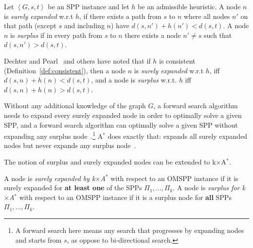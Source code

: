 \documentclass[smallextended]{svjour3}       %
\newcommand{\omspp}{\ac{OMSPP}\xspace}
\newcommand{\spp}{\ac{SPP}\xspace}
\newcommand{\astar}{A$^*$\xspace}
\newcommand{\kxastar}{k$\times$A$^*$\xspace}
\newcommand{\tuple}[1]{\ensuremath{\left \langle #1 \right \rangle }}
\begin{document}
\begin{definition}
  \label{def:surplus}
  Let $\tuple{G, s, t}$ be an \spp instance and let $h$ be an admissible heuristic.
  A node $n$ is \emph{surely expanded} w.r.t $h$, if there exists a path from $s$ to $n$ where all nodes $n'$ on that path (except $s$ and including $n$) have $d(s,n')+h(n')<d(s,t)$. 
  A node $n$ is \emph{surplus} if in every path from $s$ to $n$ there exists a node $n'\neq s$ such that $d(s,n')>d(s,t)$. 
\end{definition}
Dechter and Pearl~\cite{dechter1985generalizedBestFirst} and others have noted that if $h$ is consistent (Definition~\ref{def:consistent}), then a node $n$ is \emph{surely expanded} w.r.t $h$, iff $d(s,n)+h(n)<d(s,t)$, and a node is \emph{surplus} w.r.t. $h$ iff $d(s,n)+h(n)>d(s,t)$. 
    
    
Without any additional knowledge of the graph $G$, a forward search algorithm needs to expand every surely expanded node in order to optimally solve a given \spp, and a forward search algorithm can optimally solve a given \spp without expanding any surplus node~\cite{dechter1985generalizedBestFirst,goldenberg2014enhanced}.\footnote{A forward search here means any search that progresses by expanding nodes and starts from $s$, as oppose to bi-directional search.} 
\astar does exactly that: expands all surely expanded nodes but never expands any surplus node~\cite{dechter1985generalizedBestFirst}.

The notion of surplus and surely expanded nodes can be extended to \kxastar.
\begin{definition}[Surplus and surely expanded for \kxastar]
  \label{def:surplus-k-goal}
  A node is \emph{surely expanded by \kxastar} with respect to an \omspp instance if it is surely expanded for \textbf{at least one} of the \acp{SPP} $\Pi_1,\ldots, \Pi_k$. A node is \emph{surplus for \kxastar} with respect to an \omspp instance if it is a surplus node for \textbf{all} \acp{SPP} $\Pi_1,\ldots, \Pi_k$.
\end{definition}
\end{document}
